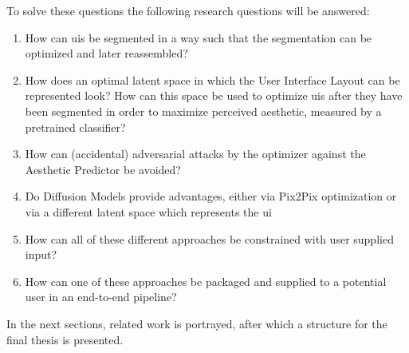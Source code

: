 \documentclass[10pt,a4paper]{scrartcl} %
\begin{document}
To solve these questions the following research questions will be answered:
\begin{enumerate}[label*=RQ \arabic*]
  \item How can \ac{uis} be segmented in a way such that the segmentation can be optimized and later reassembled?
  \item How does an optimal latent space in which the User Interface Layout can be represented look? How can this space be used to optimize \ac{uis} after they have been segmented in order to maximize perceived aesthetic, measured by a pretrained classifier?
  \item How can (accidental) adversarial attacks by the optimizer against the Aesthetic Predictor be avoided?
  \item Do Diffusion Models provide advantages, either via Pix2Pix optimization or via a different latent space which represents the \ac{ui}
  \item How can all of these different approaches be constrained with user supplied input?
  \item How can one of these approaches be packaged and supplied to a potential user in an end-to-end pipeline?
\end{enumerate}
In the next sections, related work is portrayed, after which a structure for the final thesis is presented.
\end{document}
